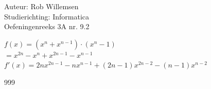 \documentclass[a4paper]{article}
\begin{document}
\noindent \large Auteur: Rob Willemsen \\
\noindent \large Studierichting: Informatica\\
\noindent \large Oefeningenreeks 3A nr. 9.2\\

\medskip

\normalsize

$f(x) = \left(x^n + x^{n-1}\right) \cdot \left(x^n - 1\right)$ \\

$= x^{2n} - x^n + x^{2n-1} - x^{n-1}$ \\

$f'(x) = 2nx^{2n-1} - nx^{n-1} + (2n-1)x^{2n-2} - (n-1)x^{n-2}$ \\

\begin{thebibliography}{999}
\end{thebibliography}
\end{document}
